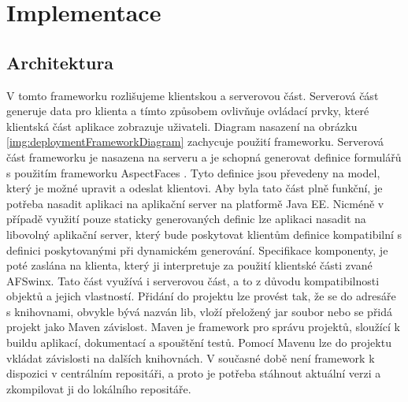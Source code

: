 \chapter{Implementace} 
\section{Architektura}
V tomto frameworku \cite{framework} rozlišujeme klientskou a serverovou část. Serverová část generuje data pro klienta a tímto způsobem ovlivňuje ovládací prvky, které klientská část aplikace zobrazuje uživateli. Diagram nasazení na obrázku \ref{img:deploymentFrameworkDiagram} zachycuje použití frameworku. Serverová část frameworku je nasazena na serveru a je schopná generovat definice formulářů s použitím frameworku AspectFaces \cite{aspectfaces}. Tyto definice jsou převedeny na model, který je možné upravit a odeslat klientovi. Aby byla tato část plně funkční, je potřeba nasadit aplikaci na aplikační server na platformě Java EE. Nicméně v případě využití pouze staticky generovaných definic lze aplikaci nasadit na libovolný aplikační server, který bude poskytovat klientům definice kompatibilní s definici poskytovanými při dynamickém generování. Specifikace komponenty, je poté zaslána na klienta, který ji interpretuje za použití klientské části zvané AFSwinx. Tato část využívá i serverovou část, a to z důvodu kompatibilnosti objektů a jejich vlastností. Přidání do projektu lze provést tak, že se do adresáře s knihovnami, obvykle bývá nazván lib, vloží přeložený jar soubor nebo se přidá projekt jako Maven závislost. Maven \cite{maven} je framework pro správu projektů, sloužící k buildu aplikací, dokumentací a spouštění testů. Pomocí Mavenu lze do projektu vkládat závislosti na dalších knihovnách. V současné době není framework k dispozici v centrálním repositáři, a proto je potřeba stáhnout aktuální verzi a zkompilovat ji do lokálního repositáře. 
